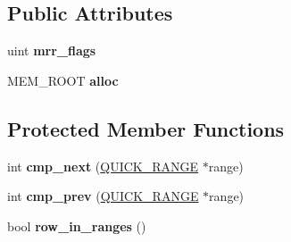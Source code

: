 \subsection*{Public Attributes}
\begin{DoxyCompactItemize}
\item 
\mbox{\label{classQUICK__RANGE__SELECT_a8c5c53526ab78ef723efd1cdfbc98743}} 
uint {\bfseries mrr\+\_\+flags}
\item 
\mbox{\label{classQUICK__RANGE__SELECT_a47f6b3abfdb2885c5c69fe51ec2d8bdf}} 
M\+E\+M\+\_\+\+R\+O\+OT {\bfseries alloc}
\end{DoxyCompactItemize}
\subsection*{Protected Member Functions}
\begin{DoxyCompactItemize}
\item 
\mbox{\label{classQUICK__RANGE__SELECT_ad5ae197f0472d1cd32db6cb34ab7f993}} 
int {\bfseries cmp\+\_\+next} (\mbox{\hyperlink{classQUICK__RANGE}{Q\+U\+I\+C\+K\+\_\+\+R\+A\+N\+GE}} $\ast$range)
\item 
\mbox{\label{classQUICK__RANGE__SELECT_a25f6ddc62ed8610a873c9e183b1fe72d}} 
int {\bfseries cmp\+\_\+prev} (\mbox{\hyperlink{classQUICK__RANGE}{Q\+U\+I\+C\+K\+\_\+\+R\+A\+N\+GE}} $\ast$range)
\item 
\mbox{\label{classQUICK__RANGE__SELECT_a166f60bada4ab7ea3c345e4417f51bb1}} 
bool {\bfseries row\+\_\+in\+\_\+ranges} ()
\end{DoxyCompactItemize}
